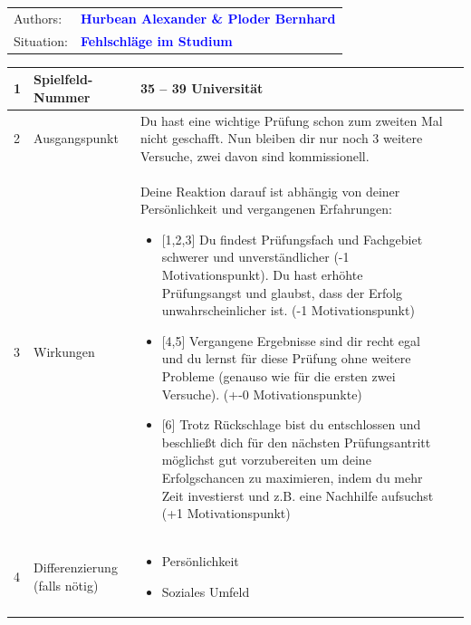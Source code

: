 \documentclass[12pt, a4paper]{article}
\newcommand{\authortext}{Hurbean Alexander \& Ploder Bernhard}
\newcommand{\situation}{Fehlschläge im Studium}
\begin{document}
\begin{tabular}{l l} 
Authors: & \textbf{\textcolor{blue}{\large\authortext}}\\ 
Situation: & \textbf{\textcolor{blue}{\large\situation}}
\end{tabular}

\vspace{1em}

\centerline{
	}

\vspace{1em}

\begin{table}[h!]
	\begin{tabularx}{\textwidth}{|p{0.3cm}|p{3.5cm}|X|p{0.3cm}|}
		\hline
		1 & Spielfeld-Nummer                       & 35 – 39 Universität &  \\
		\hline
		2 & Ausgangspunkt                          & 
		Du hast eine wichtige Prüfung schon zum zweiten Mal nicht geschafft.
		Nun bleiben dir nur noch 3 weitere Versuche, zwei davon sind kommissionell. &  \\
		\hline
		3 & Wirkungen                              &
		Deine Reaktion darauf ist abhängig von deiner Persönlichkeit und vergangenen Erfahrungen:
		\begin{itemize}[noitemsep, topsep=0pt]
			\item {[1,2,3]} Du findest Prüfungsfach und Fachgebiet schwerer und unverständlicher (-1 Motivationspunkt).	Du hast erhöhte Prüfungsangst und glaubst, dass der Erfolg unwahrscheinlicher ist. (-1 Motivationspunkt)
			\item {[4,5]} Vergangene Ergebnisse sind dir recht egal und du lernst für diese Prüfung ohne weitere Probleme (genauso wie für die ersten zwei Versuche). (+-0 Motivationspunkte)
			\item {[6]} Trotz Rückschlage bist du entschlossen und beschließt dich für den nächsten Prüfungsantritt möglichst gut vorzubereiten um deine Erfolgschancen zu maximieren, indem du mehr Zeit investierst und z.B. eine Nachhilfe aufsuchst (+1 Motivationspunkt)
		\end{itemize} &  \\
		\hline
		4 & Differenzierung \newline (falls nötig) & 
		\begin{itemize}[noitemsep, topsep=0pt]
			\item Persönlichkeit
			\item Soziales Umfeld

\end{itemize}
\end{tabularx}
\end{table}
\end{document}
